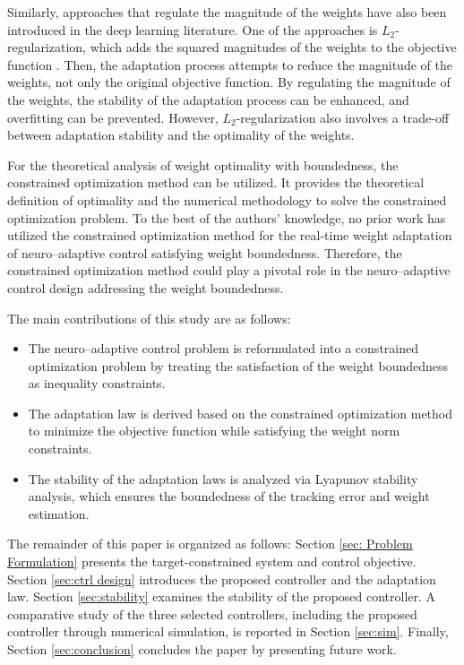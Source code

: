 \documentclass[letterpaper, 10 pt, conference]{ieeeconf}  %
\begin{document}
Similarly, approaches that regulate the magnitude of the weights have also been introduced in the deep learning literature.
One of the approaches is $L_2$-regularization, which adds the squared magnitudes of the weights to the objective function \cite{RN1, RN13}.
Then, the adaptation process attempts to reduce the magnitude of the weights, not only the original objective function.
By regulating the magnitude of the weights, the stability of the adaptation process can be enhanced, and overfitting can be prevented.
However, $L_2$-regularization also involves a trade-off between adaptation stability and the optimality of the weights.

For the theoretical analysis of weight optimality with boundedness, the constrained optimization method \cite{RN29} can be utilized.
It provides the theoretical definition of optimality and the numerical methodology to solve the constrained optimization problem.
To the best of the authors’ knowledge, no prior work has utilized the constrained optimization method for the real-time weight adaptation of neuro–adaptive control satisfying weight boundedness.
Therefore, the constrained optimization method could play a pivotal role in the neuro–adaptive control design addressing the weight boundedness.

The main contributions of this study are as follows:
\begin{itemize}
    \item The neuro–adaptive control problem is reformulated into a constrained optimization problem by treating the satisfaction of the weight boundedness as inequality constraints.
    \item The adaptation law is derived based on the constrained optimization method to minimize the objective function while satisfying the weight norm constraints.
    \item The stability of the adaptation laws is analyzed via Lyapunov stability analysis, which ensures the boundedness of the tracking error and weight estimation.
\end{itemize}

The remainder of this paper is organized as follows:
Section \ref{sec: Problem Formulation} presents the target-constrained system and control objective.
Section \ref{sec:ctrl design} introduces the proposed controller and the adaptation law. 
Section \ref{sec:stability} examines the stability of the proposed controller.
A comparative study of the three selected controllers, including the proposed controller through numerical simulation, is reported in Section \ref{sec:sim}.
Finally, Section \ref{sec:conclusion} concludes the paper by presenting future work.
\end{document}
